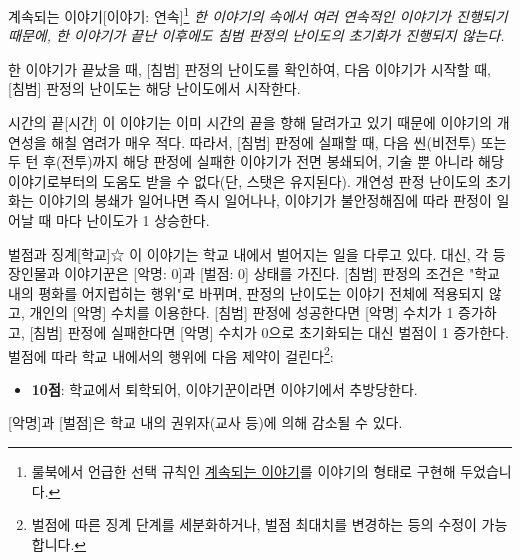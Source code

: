 \documentclass{report}
\begin{document}
	\begin{story}{계속되는 이야기}{[이야기: 연속]\footnote{룰북에서 언급한 선택 규칙인 \hyperlink{the-story-continues}{계속되는 이야기}를 이야기의 형태로 구현해 두었습니다.}}
		\textit{한 이야기의 속에서 여러 연속적인 이야기가 진행되기 때문에, 한 이야기가 끝난 이후에도 침범 판정의 난이도의 초기화가 진행되지 않는다.}
		
		한 이야기가 끝났을 때, [침범] 판정의 난이도를 확인하여, 다음 이야기가 시작할 때, [침범] 판정의 난이도는 해당 난이도에서 시작한다.
	\end{story}
	
	\begin{story}{시간의 끝}{[시간]}
		이 이야기는 이미 시간의 끝을 향해 달려가고 있기 때문에 이야기의 개연성을 해칠 염려가 매우 적다. 따라서, [침범] 판정에 실패할 때, 다음 씬(비전투) 또는 두 턴 후(전투)까지 해당 판정에 실패한 이야기가 전면 봉쇄되어, 기술 뿐 아니라 해당 이야기로부터의 도움도 받을 수 없다(단, 스탯은 유지된다). 개연성 판정 난이도의 초기화는 이야기의 봉쇄가 일어나면 즉시 일어나나, 이야기가 불안정해짐에 따라 판정이 일어날 때 마다 난이도가 1 상승한다.
	\end{story}
	
	\begin{story}{벌점과 징계}{[학교]☆}
		이 이야기는 학교 내에서 벌어지는 일을 다루고 있다. 대신, 각 등장인물과 이야기꾼은 [악명: 0]과 [벌점: 0] 상태를 가진다. [침범] 판정의 조건은 "학교 내의 평화를 어지럽히는 행위"로 바뀌며, 판정의 난이도는 이야기 전체에 적용되지 않고, 개인의 [악명] 수치를 이용한다. [침범] 판정에 성공한다면 [악명] 수치가 1 증가하고, [침범] 판정에 실패한다면 [악명] 수치가 0으로 초기화되는 대신 벌점이 1 증가한다. 벌점에 따라 학교 내에서의 행위에 다음 제약이 걸린다\footnote{벌점에 따른 징계 단계를 세분화하거나, 벌점 최대치를 변경하는 등의 수정이 가능합니다.}:
		\begin{itemize}
			\item \textbf{10점}: 학교에서 퇴학되어, 이야기꾼이라면 이야기에서 추방당한다.
		\end{itemize}
		[악명]과 [벌점]은 학교 내의 권위자(교사 등)에 의해 감소될 수 있다.
	\end{story}
\end{document}
